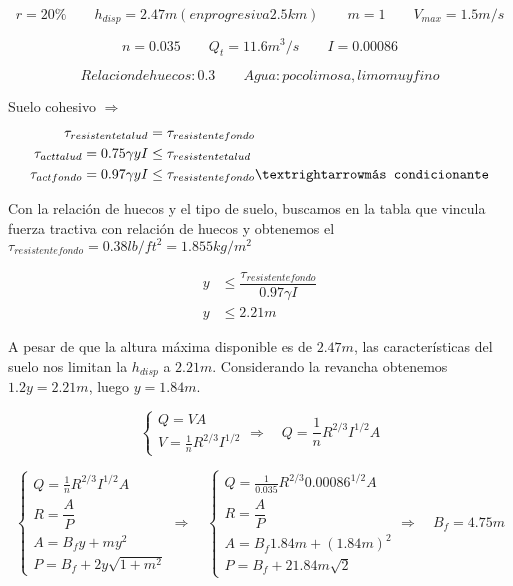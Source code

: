 \documentclass[10.5pt]{article}
\begin{document}
\begin{equation*}
  r = 20\%
 \qquad
  h_{disp} = 2.47 m (en progresiva 2.5 km)
 \qquad
  m = 1
 \qquad
  V_{max} = 1.5 m/s
\end{equation*}

\begin{equation*}
  n = 0.035
 \qquad
  Q_{t} = 11.6 m^3/s
 \qquad
  I = 0.00086
\end{equation*}

\begin{equation*}
  Relacion de huecos: 0.3
  \qquad
  Agua: poco limosa, limo muy fino
\end{equation*}

Suelo cohesivo $\Longrightarrow$
\begin{align*}
 \tau_{resistente talud} &= \tau_{resistente fondo} \\
 \tau_{act talud} = 0.75 \gamma y I &\leq \tau_{resistente talud} \\
 \tau_{act fondo} = 0.97 \gamma y I &\leq \tau_{resistente fondo} \textrightarrow \texttt{más condicionante}
\end{align*}

Con la relación de huecos y el tipo de suelo, buscamos en la tabla que vincula fuerza tractiva con relación de huecos y obtenemos
el $\tau_{resistente fondo} = 0.38 lb/ ft^2 = 1.855 kg/m^2$

\begin{align*}
 y &\leq \dfrac{\tau_{resistente fondo}}{0.97 \gamma I} \\
 y &\leq 2.21 m
\end{align*}

A pesar de que la altura máxima disponible es de $2.47 m$, las características del suelo nos limitan la $h_{disp}$ a $2.21 m$.
Considerando la revancha obtenemos $1.2 y = 2.21 m$, luego $y = 1.84 m$.


\begin{equation*}
  \begin{cases}
    Q = V A \\
    V =  \frac{1}{n} R^{2/3} I^{1/2}
  \end{cases}
  \Longrightarrow \quad
  Q = \frac{1}{n} R^{2/3} I^{1/2} A
\end{equation*}


\begin{equation*}
  \begin{cases}
    Q = \frac{1}{n} R^{2/3} I^{1/2} A \\
    R = \dfrac{A}{P} \\
    A = B_{f}y + m y^{2} \\
    P = B_{f} + 2 y \sqrt{1 + m^{2}}
  \end{cases}
  \Longrightarrow \quad
  \begin{cases}
    Q = \frac{1}{0.035} R^{2/3} 0.00086^{1/2} A \\
    R = \dfrac{A}{P} \\
    A = B_{f}1.84 m + (1.84 m)^2 \\
    P = B_{f} + 2 1.84 m \sqrt{2}
  \end{cases}
  \Longrightarrow \quad
  B_{f} = 4.75 m
\end{equation*}
\end{document}
